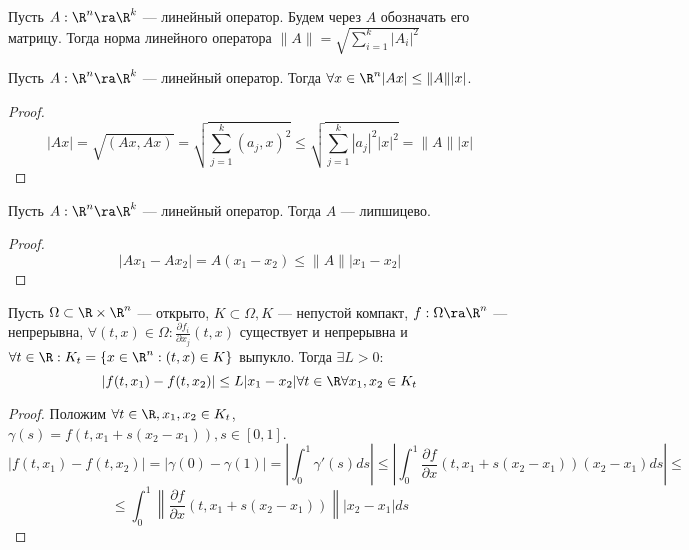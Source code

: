 \begin{definition}
	Пусть \(A: \R^n \ra \R^k\) --- линейный оператор. Будем через \(A\) обозначать его матрицу. Тогда норма линейного оператора \(\|A\| = \sqrt{\sum_{i = 1}^k |A_i|^2}\)
\end{definition}

\begin{proposition}
	Пусть \(A: \R^n \ra \R^k\) --- линейный оператор. Тогда \(\forall x \in \R^n |Ax| \le \|A\||x|\).
\end{proposition}
\begin{proof}
	\[|Ax| = \sqrt{(Ax, Ax)} = \sqrt{\sum_{j = 1}^k (a_j, x)^2} \le \sqrt{\sum_{j = 1}^k |a_j|^2|x|^2} = \|A\||x|\]
\end{proof}


\begin{corollary}
	Пусть \(A: \R^n \ra \R^k\) --- линейный оператор. Тогда \(A\) --- липшицево.
\end{corollary}
\begin{proof}
	\[|Ax_1 - Ax_2| = A(x_1 - x_2) \le \|A\||x_1 - x_2|\]
\end{proof}

\begin{proposition}
	Пусть \(\Omega \subset \R \times \R^n\) --- открыто, \(K \subset \Omega, K\) --- непустой компакт, \(f: \Omega \ra \R^n\) --- непрерывна, \(\forall (t, x) \in \Omega: \frac{\partial{f_i}}{\partial{x_j}}(t, x)\) существует и непрерывна и \(\forall t \in \R: K_t = \{x \in \R^n: (t, x) \in K\}\) выпукло. Тогда \(\exists L > 0\):
	\[|f(t, x_1) - f(t, x_2)| \le L|x_1 - x_2| \forall t \in \R \forall x_1, x_2 \in K_t\]
\end{proposition}
\begin{proof}
	Положим \(\forall t \in \R, x_1, x_2 \in K_t\), \(\gamma(s) = f(t, x_1 + s(x_2 - x_1)), s \in [0, 1]\).
	\[|f(t, x_1) - f(t, x_2)| = |\gamma(0) - \gamma(1)| = \left|\int_0^1 \gamma'(s)ds\right| \le \left|\int_0^1 \frac{\partial{f}}{\partial{x}}(t, x_1 + s(x_2 - x_1))(x_2 - x_1)ds\right| \le\]
	\[\le \int_0^1 \left\|\frac{\partial{f}}{\partial{x}}(t, x_1 + s(x_2 - x_1))\right\||x_2 - x_1|ds\]
\end{proof}

